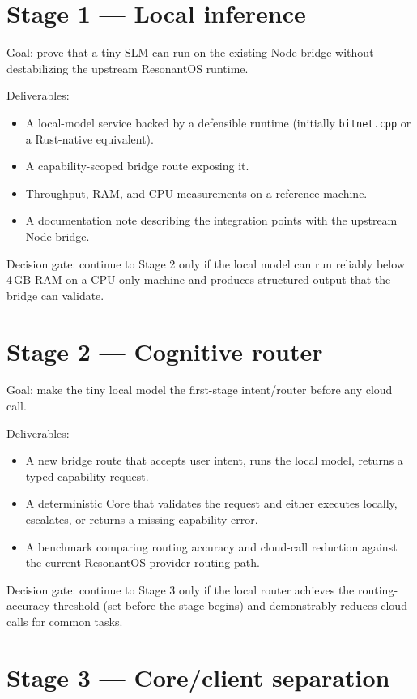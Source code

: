 \section{Stage 1 --- Local inference}

Goal: prove that a tiny SLM can run on the existing Node bridge
without destabilizing the upstream ResonantOS runtime.

Deliverables:
\begin{itemize}
  \item A local-model service backed by a defensible runtime
        (initially \texttt{bitnet.cpp} or a Rust-native equivalent).
  \item A capability-scoped bridge route exposing it.
  \item Throughput, RAM, and CPU measurements on a reference machine.
  \item A documentation note describing the integration points with
        the upstream Node bridge.
\end{itemize}

Decision gate: continue to Stage 2 only if the local model can run
reliably below 4\,GB RAM on a CPU-only machine and produces structured
output that the bridge can validate.

\section{Stage 2 --- Cognitive router}

Goal: make the tiny local model the first-stage intent/router
before any cloud call.

Deliverables:
\begin{itemize}
  \item A new bridge route that accepts user intent, runs the local
        model, returns a typed capability request.
  \item A deterministic Core that validates the request and either
        executes locally, escalates, or returns a missing-capability
        error.
  \item A benchmark comparing routing accuracy and cloud-call
        reduction against the current ResonantOS provider-routing
        path.
\end{itemize}

Decision gate: continue to Stage 3 only if the local router achieves
the routing-accuracy threshold (set before the stage begins) and
demonstrably reduces cloud calls for common tasks.

\section{Stage 3 --- Core/client separation}

